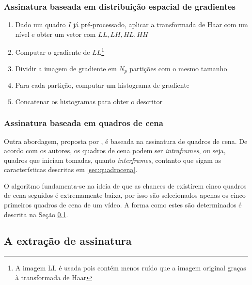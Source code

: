 \subsubsection{Assinatura baseada em distribuição espacial de gradientes}

\begin{enumerate}
\item Dado um quadro $I$ já pré-processado, aplicar a transformada de Haar com um nível e obter um vetor com $LL,LH,HL,HH$
\item Computar o gradiente de $LL$\footnote{A imagem LL é usada pois contém menos ruído que a imagem original graças à transformada de Haar}
\item Dividir a imagem de gradiente em $N_p$ partições com o mesmo tamanho
\item Para cada partição, computar um histograma de gradiente
\item Concatenar os histogramas  para obter o descritor
\end{enumerate}

%
%

\subsubsection{Assinatura baseada em quadros de cena}

  Outra abordagem, proposta por \citeauthor{mao2015sceneframe}, é baseada na assinatura de quadros de cena. De acordo com os autores, os quadros de cena podem ser \textit{intraframes}, ou seja, quadros que iniciam tomadas, quanto \textit{interframes}, contanto que sigam as características descritas em \ref{sec:quadrocena}.
    
    O algoritmo fundamenta-se na ideia de que as chances de existirem cinco quadros de cena seguidos é extremamente baixa, por isso são selecionados apenas os cinco primeiros quadros de cena de um vídeo. A forma como estes são determinados é descrita na Seção \ref{subsec:fptsceneframe}.

\subsection{A extração de assinatura}
\label{subsec:fptsceneframe}

% 

